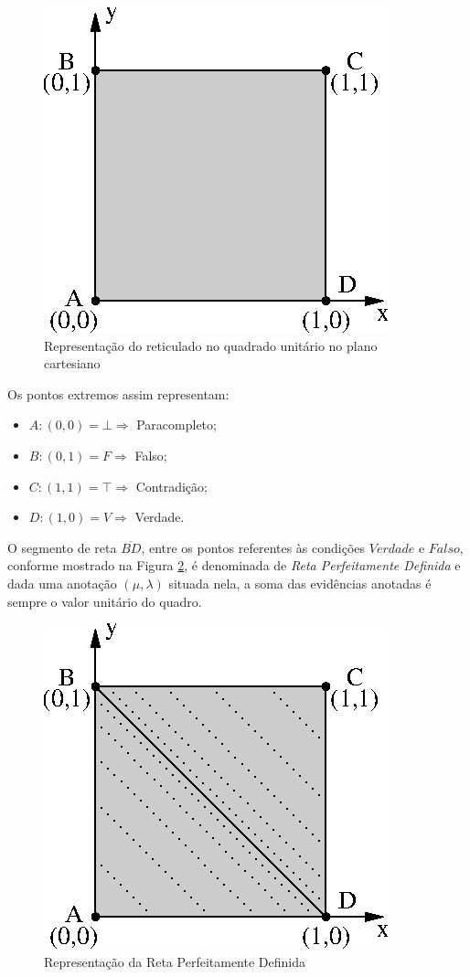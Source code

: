 \begin{figure}[!htb]
\center\includegraphics[scale=1.0]{./pic/C422qupc.eps}
\caption{Representação do reticulado no quadrado unitário no plano cartesiano}
\label{fig:reticuladoQUPC}
\end{figure}

Os pontos extremos assim representam:

\begin{itemize}
\item $A: (0,0) = \bot \Rightarrow $ Paracompleto;
\item $B: (0,1) = F \Rightarrow $ Falso;
\item $C: (1,1) = \top \Rightarrow $ Contradição;
\item $D: (1,0) = V \Rightarrow $ Verdade.
\end{itemize}

O segmento de reta $\overline{BD}$, entre os pontos referentes às condições $Verdade$ e $Falso$, conforme mostrado na Figura \ref{fig:retaPerfeitamenteDefinida}, é denominada de \emph{Reta Perfeitamente Definida} e dada uma anotação $(\mu, \lambda )$ situada nela, a soma das evidências anotadas é sempre o valor unitário do quadro. 

\begin{figure}[!htb]
\center\includegraphics[scale=1.25]{./pic/C424retaPerfeitamenteDefinida.eps}
\caption{Representação da Reta Perfeitamente Definida}
\label{fig:retaPerfeitamenteDefinida}
\end{figure}

